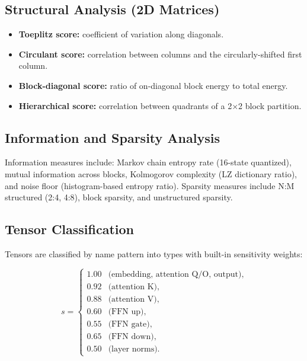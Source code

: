 \documentclass[11pt,a4paper,openright]{book}
\begin{document}
\subsection{Structural Analysis (2D Matrices)}

\begin{itemize}
	\item \textbf{Toeplitz score:} coefficient of variation along diagonals.
	\item \textbf{Circulant score:} correlation between columns and the circularly-shifted first column.
	\item \textbf{Block-diagonal score:} ratio of on-diagonal block energy to total energy.
	\item \textbf{Hierarchical score:} correlation between quadrants of a 2$\times$2 block partition.
\end{itemize}

\subsection{Information and Sparsity Analysis}

Information measures include: Markov chain entropy rate (16-state quantized), mutual information across blocks, Kolmogorov complexity (LZ dictionary ratio), and noise floor (histogram-based entropy ratio). Sparsity measures include N:M structured (2:4, 4:8), block sparsity, and unstructured sparsity.

\subsection{Tensor Classification}

Tensors are classified by name pattern into types with built-in sensitivity weights:

\begin{equation}
	\label{eq:sensitivity}
	s =
	\begin{cases}
		1.00 & \text{(embedding, attention Q/O, output)}, \\
		0.92 & \text{(attention K)},                      \\
		0.88 & \text{(attention V)},                      \\
		0.60 & \text{(FFN up)},                           \\
		0.55 & \text{(FFN gate)},                         \\
		0.65 & \text{(FFN down)},                         \\
		0.50 & \text{(layer norms)}.
	\end{cases}
\end{equation}
\end{document}
